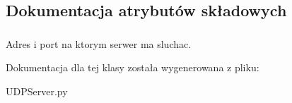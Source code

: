 \subsection{Dokumentacja atrybutów składowych}
\hypertarget{class_serv_1_1_u_d_p_server_1_1_u_d_p_server_a19f6bc70abc4eb1d1c0806a9364d1fbe}{
\subsubsection[{addr}]{}}
\label{class_serv_1_1_u_d_p_server_1_1_u_d_p_server_a19f6bc70abc4eb1d1c0806a9364d1fbe}


Adres i port na ktorym serwer ma sluchac. 



Dokumentacja dla tej klasy została wygenerowana z pliku:\begin{DoxyCompactItemize}
\item 
UDPServer.py\end{DoxyCompactItemize}
